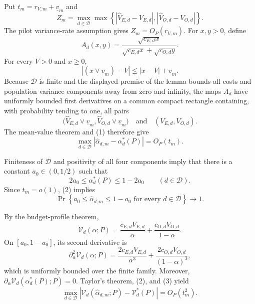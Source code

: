 Put \(t_m=r_{V,m}+\underline v_m\) and
\[
 Z_m=\max_{d\in\mathcal D}\max\left\{
 |\widehat V_{E,d}-V_{E,d}|,
 |\widehat V_{O,d}-V_{O,d}|\right\}.
\]
The pilot variance-rate assumption gives \(Z_m=O_P(r_{V,m})\).  For \(x,y>0\), define
\[
 A_d(x,y)=
 \frac{\sqrt{c_{E,d}x}}
 {\sqrt{c_{E,d}x}+\sqrt{c_{O,d}y}}.
\]
For every \(V>0\) and \(x\geq0\),
\[
 |(x\vee\underline v_m)-V|
 \leq |x-V|+\underline v_m.                                      \tag{1}
\]
Because \(\mathcal D\) is finite and the displayed premise of the lemma bounds all costs and population variance components away from zero and infinity, the maps \(A_d\) have uniformly bounded first derivatives on a common compact rectangle containing, with probability tending to one, all pairs
\[
 \bigl(\widehat V_{E,d}\vee\underline v_m,
       \widehat V_{O,d}\vee\underline v_m\bigr)
 \quad\text{and}\quad (V_{E,d},V_{O,d}).
\]
The mean-value theorem and (1) therefore give
\[
 \max_{d\in\mathcal D}
 |\widehat\alpha_{d,m}-\alpha_d^*(P)|=O_P(t_m).                    \tag{2}
\]

Finiteness of \(\mathcal D\) and positivity of all four components imply that there is a constant \(a_0\in(0,1/2)\) such that
\[
 2a_0\leq\alpha_d^*(P)\leq1-2a_0
 \qquad(d\in\mathcal D).
\]
Since \(t_m=o(1)\), (2) implies
\[
 \Pr\left\{a_0\leq\widehat\alpha_{d,m}\leq1-a_0
       \text{ for every }d\in\mathcal D\right\}\longrightarrow1. \tag{3}
\]

By the budget-profile theorem,
\[
 \mathcal V_d(\alpha;P)
 =\frac{c_{E,d}V_{E,d}}{\alpha}
  +\frac{c_{O,d}V_{O,d}}{1-\alpha}.
\]
On \([a_0,1-a_0]\), its second derivative is
\[
 \partial_\alpha^2\mathcal V_d(\alpha;P)
 =\frac{2c_{E,d}V_{E,d}}{\alpha^3}
  +\frac{2c_{O,d}V_{O,d}}{(1-\alpha)^3},
\]
which is uniformly bounded over the finite family.  Moreover,
\(\partial_\alpha\mathcal V_d(\alpha_d^*(P);P)=0\).  Taylor's theorem, (2), and (3) yield
\[
 \max_{d\in\mathcal D}
 \left|\mathcal V_d(\widehat\alpha_{d,m};P)
             -\mathcal V_d^*(P)\right|=O_P(t_m^2).                 \tag{4}
\]


